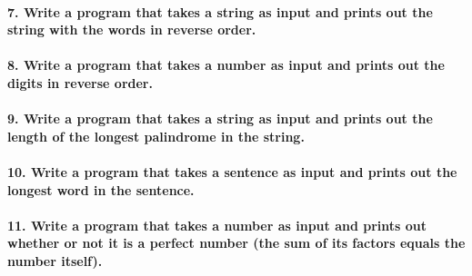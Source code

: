 \documentclass[11pt]{article}
\begin{document}
\hypertarget{write-a-program-that-takes-a-string-as-input-and-prints-out-the-string-with-the-words-in-reverse-order.}{%
\paragraph{7. Write a program that takes a string as input and prints
out the string with the words in reverse
order.}\label{write-a-program-that-takes-a-string-as-input-and-prints-out-the-string-with-the-words-in-reverse-order.}}

\hypertarget{write-a-program-that-takes-a-number-as-input-and-prints-out-the-digits-in-reverse-order.}{%
\paragraph{8. Write a program that takes a number as input and prints
out the digits in reverse
order.}\label{write-a-program-that-takes-a-number-as-input-and-prints-out-the-digits-in-reverse-order.}}

\hypertarget{write-a-program-that-takes-a-string-as-input-and-prints-out-the-length-of-the-longest-palindrome-in-the-string.}{%
\paragraph{9. Write a program that takes a string as input and prints
out the length of the longest palindrome in the
string.}\label{write-a-program-that-takes-a-string-as-input-and-prints-out-the-length-of-the-longest-palindrome-in-the-string.}}

\hypertarget{write-a-program-that-takes-a-sentence-as-input-and-prints-out-the-longest-word-in-the-sentence.}{%
\paragraph{10. Write a program that takes a sentence as input and prints
out the longest word in the
sentence.}\label{write-a-program-that-takes-a-sentence-as-input-and-prints-out-the-longest-word-in-the-sentence.}}

\hypertarget{write-a-program-that-takes-a-number-as-input-and-prints-out-whether-or-not-it-is-a-perfect-number-the-sum-of-its-factors-equals-the-number-itself.}{%
\paragraph{11. Write a program that takes a number as input and prints
out whether or not it is a perfect number (the sum of its factors equals
the number
itself).}\label{write-a-program-that-takes-a-number-as-input-and-prints-out-whether-or-not-it-is-a-perfect-number-the-sum-of-its-factors-equals-the-number-itself.}}
\end{document}
